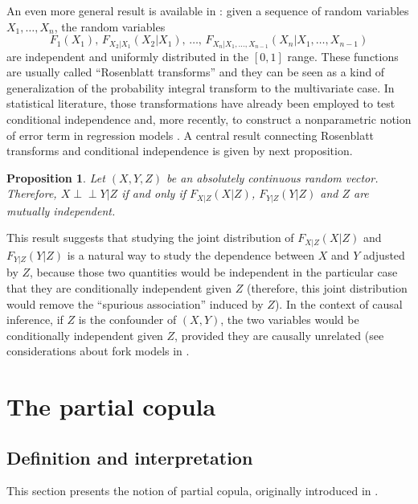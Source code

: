 \documentclass[
]{article}
\newtheorem{proposition}{Proposition}
\begin{document}
An even more general result is available in \citet{rosenblatt1952}:
given a sequence of random variables \(X_1, \ldots, X_n\), the random
variables
\[F_1(X_1), \, F_{X_2|X_1}(X_2|X_1), \, \ldots, \, F_{X_n|X_1,\ldots,X_{n-1}}(X_n|X_1, \ldots, X_{n-1})\]
are independent and uniformly distributed in the \([0,1]\) range. These
functions are usually called ``Rosenblatt transforms'' and they can be
seen as a kind of generalization of the probability integral transform
to the multivariate case. In statistical literature, those
transformations have already been employed to test conditional
independence \citep{bergsma2004, Song, patra2016} and, more recently, to
construct a nonparametric notion of error term in regression models
\citep{patra2016}. A central result connecting Rosenblatt transforms and
conditional independence is given by next proposition.

\begin{proposition}\citep{patra2016}
Let $(X, Y, Z)$ be an absolutely continuous random vector. Therefore, $X \perp\!\!\!\perp Y | Z$ if and only if $F_{X|Z}(X|Z)$, $F_{Y|Z}(Y|Z)$ and $Z$ are mutually independent.
\end{proposition}

This result suggests that studying the joint distribution of
\(F_{X|Z}(X|Z)\) and \(F_{Y|Z}(Y|Z)\) is a natural way to study the
dependence between \(X\) and \(Y\) adjusted by \(Z\), because those two
quantities would be independent in the particular case that they are
conditionally independent given \(Z\) (therefore, this joint
distribution would remove the ``spurious association'' induced by
\(Z\)). In the context of causal inference, if \(Z\) is the confounder
of \((X,Y)\), the two variables would be conditionally independent given
\(Z\), provided they are causally unrelated (see considerations about
fork models in \citep{pearl2009, pearl2016}.

\section{The partial copula}\label{the-partial-copula}

\subsection{Definition and
interpretation}\label{definition-and-interpretation}

This section presents the notion of partial copula, originally
introduced in \citet{bergsma2004}.
\end{document}
